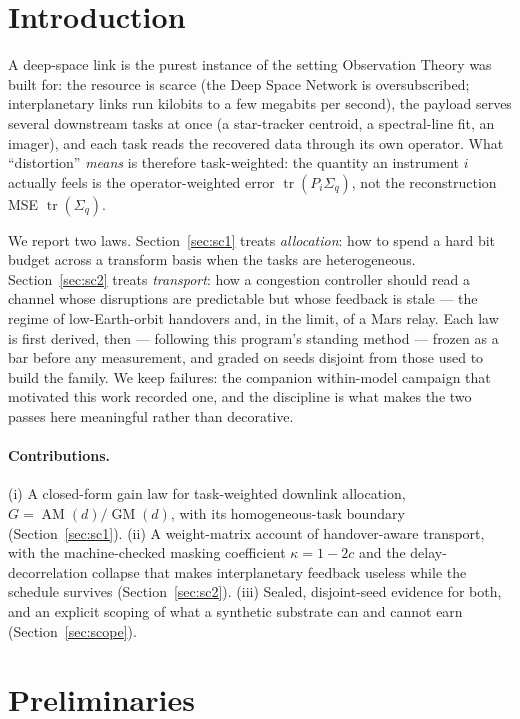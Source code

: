 \documentclass[11pt]{article}
\theoremstyle{definition}
\theoremstyle{remark}
\newcommand{\tr}{\operatorname{tr}}
\newcommand{\AM}{\operatorname{AM}}
\newcommand{\GM}{\operatorname{GM}}
\newcommand{\Sq}{\Sigma_{q}}
\begin{document}
\section{Introduction}

A deep-space link is the purest instance of the setting Observation
Theory was built for: the resource is scarce (the Deep Space Network is
oversubscribed; interplanetary links run kilobits to a few megabits per
second), the payload serves several downstream tasks at once (a
star-tracker centroid, a spectral-line fit, an imager), and each task
reads the recovered data through its own operator. What ``distortion''
\emph{means} is therefore task-weighted: the quantity an instrument
$i$ actually feels is the operator-weighted error $\tr(P_i\Sq)$, not the
reconstruction MSE $\tr(\Sq)$.

We report two laws. Section~\ref{sec:sc1} treats \emph{allocation}: how to
spend a hard bit budget across a transform basis when the tasks are
heterogeneous. Section~\ref{sec:sc2} treats \emph{transport}: how a
congestion controller should read a channel whose disruptions are
predictable but whose feedback is stale --- the regime of low-Earth-orbit
handovers and, in the limit, of a Mars relay. Each law is first derived,
then --- following this program's standing method --- frozen as a bar
before any measurement, and graded on seeds disjoint from those used to
build the family. We keep failures: the companion within-model campaign
that motivated this work recorded one, and the discipline is what makes
the two passes here meaningful rather than decorative.

\paragraph{Contributions.}
(i) A closed-form gain law for task-weighted downlink allocation,
$G=\AM(d)/\GM(d)$, with its homogeneous-task boundary
(Section~\ref{sec:sc1}). (ii) A weight-matrix account of handover-aware
transport, with the machine-checked masking coefficient $\kappa=1-2c$ and
the delay-decorrelation collapse that makes interplanetary feedback
useless while the schedule survives (Section~\ref{sec:sc2}). (iii) Sealed,
disjoint-seed evidence for both, and an explicit scoping of what a
synthetic substrate can and cannot earn (Section~\ref{sec:scope}).

\section{Preliminaries}
\end{document}
